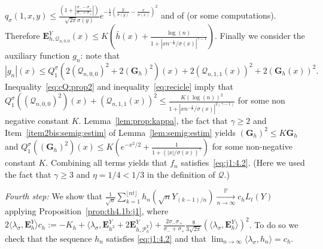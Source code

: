 \documentclass[12pt]{article}
\numberwithin{equation}{section}
\theoremstyle{definition}
\theoremstyle{remark}
\newcommand{\convp}[1][]{\xrightarrow[#1]{\PP}}
\newcommand{\NN}{\mathbb{N}}
\newcommand{\RR}{\mathbb{R}}
\newcommand{\PP}{\mathbb{P}}
\newcommand{\cQ}{\mathcal{Q}}
\newcommand{\bfH}[1]{\mathbf{E}^Y_{#1}}
\newcommand{\bfG}[1]{\mathbf{G}_{#1}}
\begin{document}
$
	q_\sigma(1,x,y) \leq \frac{\left(1+\left|\frac{\sigma_--\sigma_+}{\sigma_-+\sigma_+}\right|\right)}{\sqrt{2\pi}\sigma(y)} e^{-\frac12(\frac{y}{\sigma(y)}-\frac{x}{\sigma(x)})^2}
$
and of \cite[Lemma~3.2]{j1} (or some computations).
%
%
Therefore 
$
	\bfH{h, \cQ_{n,0,0}}(x) \leq K \left(\bar h(x) + \frac{ \log (n)}{1+|x n^{-\frac18}/\sigma(x)|^{\gamma-1}} \right)\!.$
%
Finally we consider the auxiliary function $g_n$: note that
$
	|g_n|(x) \leq Q^\sigma_1 (  2 (\cQ_{n,0,0})^2 + 2 (\bfG{h})^2)(x) + 2 (\cQ_{n,1,1}(x))^2 +  2(\bfG{h}(x))^2.
$
Inequality~\eqref{eq:cQ:prop2} and inequality~\eqref{eq:recicle} imply that
$Q^\sigma_1 \left(  (\cQ_{n,0,0})^2 \right) (x)+ (\cQ_{n,1,1}(x))^2 \leq \frac{ K (\log (n))^2}{1+|x n^{-\frac18}/\sigma(x)|^{2(\gamma-1)}}$
for some non negative constant $K$.
Lemma~\ref{lem:prop:kappa}, the fact that $\gamma \geq 2$ and Item~\ref{item2bis:semig:estim} of Lemma~\ref{lem:semig:estim} yields $(\bfG{h})^2\leq K  \bfG{h}$ and
$
	Q^\sigma_1 \left((\bfG{h})^2\right) (x) \leq K (e^{-x^2/2} + \frac{1}{1+({|x|}/{\sigma(x)})^\gamma})
$
for some non-negative constant $K$.
%
%
%
Combining all terms yields that $f_n$ satisfies~\eqref{eq:j1:4.2}. (Here we used the fact that $\gamma \geq 3$ and $\eta=1/4<1/3$ in the definition of $\cQ$.)

{\em Fourth step:\/} 
We show that
$
	\frac1{\sqrt n}  \sum_{k=1}^{\lfloor n t \rfloor} h_n(\sqrt{n} Y_{(k-1)/n}) \convp[n\to\infty]
	c_h L_t(Y)
$
applying Proposition~\ref{prop:th4.1b:j1},
where 
$ 2 \langle \lambda_\sigma , \bfH h \rangle c_h:= - K_h + 
	\langle \lambda_\sigma , \bfH {h^2} + 2 \bfH{h,\mathcal{P}_{h}^{Y} } \rangle 
	+ \frac{ 2 \sigma_- \sigma_+}{\sigma_-+\sigma_+} \frac{8}{3 \sqrt{2\pi}} (\langle \lambda_\sigma , \bfH h \rangle)^2 $.
To do so we check that the sequence $h_n$ satisfies \eqref{eq:j1:4.2} and that 
$
	\lim_{n\to\infty} \langle \lambda_\sigma , h_n \rangle=c_h
$.
\end{document}
